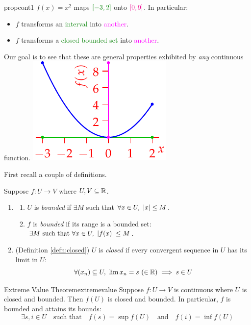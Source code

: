 \begin{example}[lower separated=false, sidebyside, sidebyside align=top seam, sidebyside gap=0pt, righthand width=0.3\linewidth]{}{propcont1}
	$f(x)=x^2$ maps $\textcolor{Green}{[-3,2]}$ onto $\textcolor{magenta}{[0,9]}$. In particular:
	\begin{itemize}\itemsep0pt
	  \item $f$ transforms an \textcolor{Green}{interval} into \textcolor{magenta}{another}.
	  \item $f$ transforms a \textcolor{Green}{closed bounded set} into \textcolor{magenta}{another}.
	\end{itemize}
	Our goal is to see that these are general properties exhibited by \emph{any} continuous function. 
	\tcblower
	\flushright\includegraphics[scale=0.95]{properties-ex1}
\end{example}


First recall a couple of definitions.

\begin{defn}{}{}
Suppose $f:U\to V$ where $U,V\subseteq\mathbb{R}$.
	\begin{enumerate}
	  \item\begin{enumerate}
	    \item $U$ is \emph{bounded} if $\exists M$ such that $\forall x\in U,\ \left| x\right|\le M$.
	    \item $f$ is \emph{bounded} if its range is a bounded set: $\exists M\text{ such that }\forall x\in U,\ \nm{f(x)}\le M$.
	  \end{enumerate}
	  \item (Definition \ref{defn:closed}) $U$ is \emph{closed} if every convergent sequence in $U$ has its limit in $U$:
		\[
			\forall (x_n)\subseteq U,\ \lim x_n=s\ (\in\R)\implies s\in U
		\]
	\end{enumerate}
\end{defn}

\begin{thm}{Extreme Value Theorem}{extremevalue}
	Suppose $f:U\to V$ is continuous where $U$ is closed and bounded. Then $f(U)$ is closed and bounded. In particular, $f$ is bounded and attains its bounds:
	\[
		\exists s,i\in U\quad \text{such that}\quad f(s)=\sup f(U)
		\quad\text{and}\quad	
		f(i)=\inf f(U)
	\]
\end{thm}



